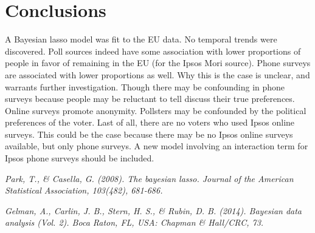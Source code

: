 \documentclass{../../tex_template/asaproc}
\begin{document}
\section{Conclusions}
A Bayesian lasso model was fit to the EU data. No temporal trends were
discovered. Poll sources indeed have some association with lower proportions of
people in favor of remaining in the EU (for the Ipsos Mori source). Phone
surveys are associated with lower proportions as well. Why this is the case is
unclear, and warrants further investigation.  Though there may be confounding
in phone surveys because people may be reluctant to tell discuss their true
preferences. Online surveys promote anonymity. Pollsters may be confounded by
the political preferences of the voter. Last of all, there are no voters who
used Ipsos online surveys. This could be the case because there may be no Ipsos
online surveys available, but only phone surveys. A new model involving an
interaction term for Ipsos phone surveys should be included.

\begin{references}
{\footnotesize
\itemsep=3pt
\item {\em Park, T., \& Casella, G. (2008). The bayesian lasso. Journal of the American Statistical Association, 103(482), 681-686.}
\item {\em Gelman, A., Carlin, J. B., Stern, H. S., \& Rubin, D. B. (2014). Bayesian data analysis (Vol. 2). Boca Raton, FL, USA: Chapman \& Hall/CRC, 73.}
}

\end{references}
\end{document}
